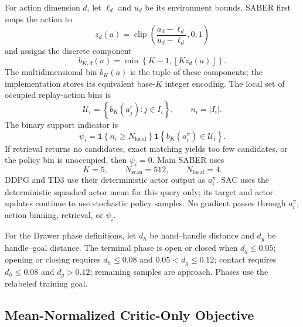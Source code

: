 For action dimension \(d\), let \(\ell_d\) and \(u_d\) be its environment
bounds. SABER first maps the action to
\begin{equation}
z_d(a)=
\operatorname{clip}\!\left(
\frac{a_d-\ell_d}{u_d-\ell_d},0,1\right)
\label{eq:supp-action-normalization}
\end{equation}
and assigns the discrete component
\begin{equation}
b_{K,d}(a)=
\min\!\left\{K-1,\left\lfloor Kz_d(a)\right\rfloor\right\}.
\label{eq:supp-action-bin-component}
\end{equation}
The multidimensional bin \(b_K(a)\) is the tuple of these components; the
implementation stores its equivalent base-\(K\) integer encoding. The local
set of occupied replay-action bins is
\begin{equation}
\mathcal U_i=
\left\{b_K(a_j^r):j\in I_i\right\},
\qquad n_i=|I_i|.
\label{eq:supp-occupied-bins}
\end{equation}
The binary support indicator is
\begin{equation}
\psi_i=
\mathbf 1\!\left\{n_i\geq N_{\mathrm{local}}\right\}
\mathbf 1\!\left\{b_K(a_i^\pi)\in\mathcal U_i\right\}.
\label{eq:supp-support-indicator}
\end{equation}
If retrieval returns no candidates, exact matching yields too few candidates,
or the policy bin is unoccupied, then \(\psi_i=0\). Main SABER uses
\[
K=5,\qquad N_{\mathrm{scan}}=512,\qquad N_{\mathrm{local}}=4.
\]
DDPG and TD3 use their deterministic actor output as \(a_i^\pi\). SAC uses
the deterministic squashed actor mean for this query only; its target and
actor updates continue to use stochastic policy samples. No gradient passes
through \(a_i^\pi\), action binning, retrieval, or \(\psi_i\).



For the Drawer phase definitions, let \(d_h\) be hand--handle distance and
\(d_g\) be handle--goal distance. The terminal phase is open or closed when
\(d_g\leq0.05\); opening or closing requires \(d_h\leq0.08\) and
\(0.05<d_g\leq0.12\); contact requires \(d_h\leq0.08\) and \(d_g>0.12\);
remaining samples are approach. Phases use the relabeled training goal.

\subsection{Mean-Normalized Critic-Only Objective}
\label{sec:supp-saber-objective}

